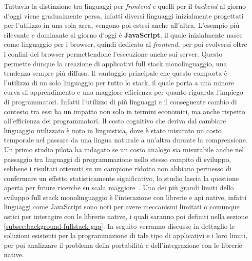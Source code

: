 Tuttavia la distinzione tra linguaggi per \textit{frontend} e quelli per il \textit{backend} al giorno d'oggi viene gradualmente persa, infatti diversi linguaggi inizialmente progettati per l'utilizzo in una sola area, vengono poi estesi anche all'altra.
L'esempio più rilevante e dominante al giorno d'oggi è \textbf{JavaScript}, il quale inizialmente nasce come linguaggio per i browser, quindi dedicato al \textit{frontend}, per poi evolversi oltre i confini del browser permettendone l'esecuzione anche sui server. 
Questo permette dunque la creazione di applicativi full stack monolinguaggio, una tendenza sempre più diffusa.
Il vantaggio principale che questo comporta è l'utilizzo di un solo linguaggio per tutto lo stack, il quale porta a una minore curva di apprendimento e una maggiore efficienza per quanto riguarda l'impiego di programmatori. Infatti l'utilizzo di più linguaggi e il conseguente cambio di contesto tra essi ha un impatto non solo in termini economici, ma anche rispetto all'efficienza dei programmatori. Il costo cognitivo che deriva dal cambiare linguaggio utilizzato è noto in linguistica, dove è stato misurato un costo temporale nel passare da una 
lingua naturale a un'altra durante la comprensione.
Un primo studio pilota ha indagato se un costo analogo sia misurabile anche nel passaggio tra linguaggi di programmazione nello stesso compito di sviluppo, sebbene i risultati ottenuti su un campione ridotto non abbiano permesso di confermare un effetto statisticamente significativo, lo studio lascia la questione aperta per future ricerche su scala maggiore~\cite{DBLP:conf/oopsla/UesbeckS18}.
Uno dei più grandi limiti dello sviluppo full stack monolinguaggio è l'interazione con librerie e \ac{api} native, infatti linguaggi come JavaScript sono noti per avere meccanismi limitati o comunque ostici per interagire con le librerie native, i quali saranno poi definiti nella sezione \ref{subsec:background-fullstack-gap}.
In seguito verranno discusse in dettaglio le soluzioni esistenti per la programmazione di
tale tipo di applicativi e i loro limiti, per poi analizzare il problema della portabilità e
dell'integrazione con le librerie native.

